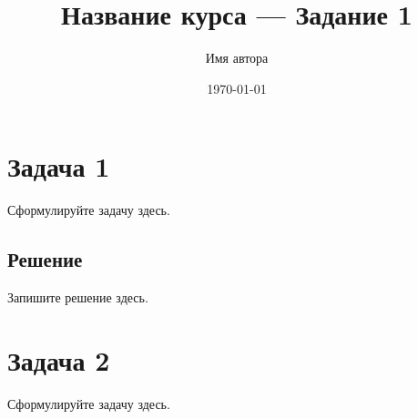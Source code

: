 \documentclass[11pt]{article}
\title{Название курса — Задание 1}
\author{Имя автора}
\date{\today}
\begin{document}
\maketitle

\section*{Задача 1}
Сформулируйте задачу здесь.

\subsection*{Решение}
Запишите решение здесь.

\section*{Задача 2}
Сформулируйте задачу здесь.
\end{document}
